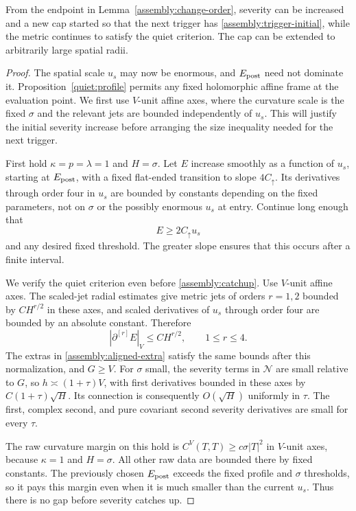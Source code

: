 \begin{lemma}\label{assembly:reset}
From the endpoint in Lemma~\ref{assembly:change-order}, severity
can be increased and a new cap started so that the next trigger
has \eqref{assembly:trigger-initial}, while the metric continues
to satisfy the quiet criterion. The cap can be extended to
arbitrarily large spatial radii.
\end{lemma}

\begin{proof}
The spatial scale $u_s$ may now be enormous, and $E_{\rm post}$ need
not dominate it. Proposition~\ref{quiet:profile} permits any fixed
holomorphic affine frame at the evaluation point. We first use
$V$-unit affine axes, where the curvature scale is the fixed $\sigma$
and the relevant jets are bounded independently of $u_s$. This will
justify the initial severity increase before arranging the size
inequality needed for the next trigger.

First hold $\kappa=p=\lambda=1$ and $H=\sigma$.
Let $E$ increase smoothly as a function of $u_s$, starting at
$E_{\rm post}$, with a fixed flat-ended transition to slope
$4C_\uparrow$. Its derivatives through order four in $u_s$
are bounded by constants depending on the fixed parameters,
not on $\sigma$ or the possibly enormous $u_s$ at entry.
Continue long enough that
\begin{equation}\label{assembly:catchup}
 E\geq2C_\uparrow u_s
\end{equation}
and any desired fixed threshold. The greater slope ensures
that this occurs after a finite interval.

We verify the quiet criterion even before \eqref{assembly:catchup}.
Use $V$-unit affine axes. The scaled-jet radial estimates give
metric jets of orders $r=1,2$ bounded by $CH^{r/2}$ in these
axes, and scaled derivatives of $u_s$ through order four are
bounded by an absolute constant. Therefore
\[
 |\partial^{[r]}E|_{V}\leq C H^{r/2},\qquad 1\leq r\leq4.
\]
The extras in \eqref{assembly:aligned-extra} satisfy the same
bounds after this normalization, and $G\geq V$.
For $\sigma$ small, the severity terms in $\mathcal N$ are
small relative to $G$, so
$h\asymp(1+\tau)V$, with first derivatives bounded in these
axes by $C(1+\tau)\sqrt H$.
Its connection is consequently $O(\sqrt H)$ uniformly in
$\tau$. The first, complex second, and pure covariant second
severity derivatives are small for every $\tau$.

The raw curvature margin on this hold is
$C^V(T,T)\geq c\sigma|T|^2$ in $V$-unit axes, because
$\kappa=1$ and $H=\sigma$. All other raw data are bounded there
by fixed constants. The previously chosen $E_{\rm post}$
exceeds the fixed profile and $\sigma$ thresholds, so it
pays this margin even when it is much smaller than the current
$u_s$. Thus there is no gap before severity catches up.


\end{proof}
